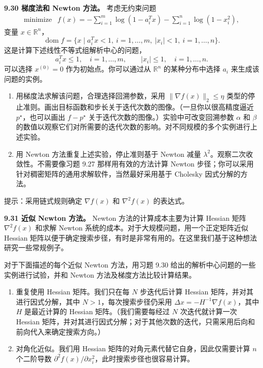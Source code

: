 \documentclass[UTF8, 12pt, fontset=fandol, oneside]{ctexart}
\begin{document}
\noindent\textbf{9.30 梯度法和 Newton 方法。}\quad
考虑无约束问题
\[
\begin{array}{ll}
\mbox{minimize} & f(x)=-\displaystyle\sum_{i=1}^m\log(1-a_i^Tx)-\sum_{i=1}^n\log(1-x_i^2),
\end{array}
\]
变量 $x\in\mathbb{R}^n$，
\[
\operatorname{dom} f=\{x\mid a_i^Tx<1,\ i=1,\ldots,m,\ |x_i|<1,\ i=1,\ldots,n\}.
\]
这是计算下述线性不等式组解析中心的问题，
\[
a_i^Tx\leq1,\quad i=1,\ldots,m,\qquad |x_i|\leq1,\quad i=1,\ldots,n.
\]
可以选择 $x^{(0)}=0$ 作为初始点。你可以通过从 $\mathbb{R}^n$ 的某种分布中选择 $a_i$ 来生成该问题的实例。
\begin{enumerate}
\item[(a)] 用梯度法求解该问题，合理选择回溯参数，采用 $\|\nabla f(x)\|_2\leq\eta$ 类型的停止准则。画出目标函数和步长关于迭代次数的图像。（一旦你以很高精度逼近 $p^\star$，也可以画出 $f-p^\star$ 关于迭代次数的图像。）实验中可改变回溯参数 $\alpha$ 和 $\beta$ 的数值以观察它们对所需要的迭代次数的影响。对不同规模的多个实例进行上述实验。
\item[(b)] 用 Newton 方法重复上述实验，停止准则基于 Newton 减量 $\lambda^2$。观察二次收敛性。不需要像习题 9.27 那样用有效的方法计算 Newton 步径；你可以采用针对稠密矩阵的通用求解软件，当然最好采用基于 Cholesky 因式分解的方法。
\end{enumerate}
提示：采用链式规则确定 $\nabla f(x)$ 和 $\nabla^2 f(x)$ 的表达式。

\noindent\textbf{9.31 近似 Newton 方法。}\quad
Newton 方法的计算成本主要为计算 Hessian 矩阵 $\nabla^2 f(x)$ 和求解 Newton 系统的成本。对于大规模问题，用一个正定矩阵近似 Hessian 矩阵以便于确定搜索步径，有时是非常有用的。在这里我们基于这种想法研究一些常规例子。

对于下面描述的每个近似 Newton 方法，用习题 9.30 给出的解析中心问题的一些实例进行试验，并和 Newton 方法及梯度方法比较计算结果。
\begin{enumerate}
\item[(a)] 重复使用 Hessian 矩阵。我们只在每 $N$ 步迭代后计算 Hessian 矩阵，并对其进行因式分解，其中 $N>1$，每次搜索步径仍采用 $\Delta x=-H^{-1}\nabla f(x)$，其中 $H$ 是最近计算的 Hessian 矩阵。（我们需要每经过 $N$ 次迭代就计算一次 Hessian 矩阵，并对其进行因式分解；对于其他次数的迭代，只需采用后向和前向代入来确定搜索方向。）
\item[(b)] 对角化近似。我们用 Hessian 矩阵的对角元素代替它自身，因此仅需要计算 $n$ 个二阶导数 $\partial^2 f(x)/\partial x_i^2$，此时搜索步径也很容易计算。
\end{enumerate}
\end{document}
